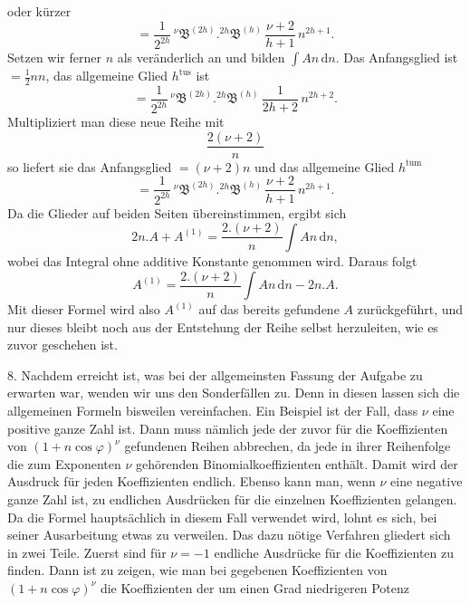 \par\noindent{}%
oder kürzer
\[
= \frac{1}{2^{2h}}\,{}^{\nu}\mathfrak{B}^{(2h)} .  {}^{2h}\mathfrak{B}^{(h)}\,\frac{\nu+2}{h+1}\,n^{2h+1}.
\]
Setzen wir ferner $n$ als veränderlich an und bilden $\int An\,\mathrm{d}n$. Das Anfangsglied ist $=\frac{1}{2}nn$, das allgemeine Glied $h^{\text{tus}}$ ist
\[
= \frac{1}{2^{2h}}\,{}^{\nu}\mathfrak{B}^{(2h)} .  {}^{2h}\mathfrak{B}^{(h)}\,\frac{1}{2h+2}\,n^{2h+2}.
\]
Multipliziert man diese neue Reihe mit
\[
\frac{2(\nu+2)}{n}
\]
so liefert sie das Anfangsglied $=(\nu+2)n$ und das allgemeine Glied $h^{\text{tum}}$
\[
= \frac{1}{2^{2h}}\,{}^{\nu}\mathfrak{B}^{(2h)} .  {}^{2h}\mathfrak{B}^{(h)}\,\frac{\nu+2}{h+1}\,n^{2h+1}.
\]
Da die Glieder auf beiden Seiten übereinstimmen, ergibt sich
\[
2n .  A + A^{(1)} = \frac{2 . (\nu+2)}{n}\int An\,\mathrm{d}n,
\]
wobei das Integral ohne additive Konstante genommen wird. Daraus folgt
\[
A^{(1)} = \frac{2 . (\nu+2)}{n}\int An\,\mathrm{d}n - 2n .  A.
\]
\noindent\hspace*{\parindent}Mit dieser Formel wird also $A^{(1)}$ auf das bereits gefundene $A$ zurückgeführt, und nur dieses bleibt noch aus der Entstehung der Reihe selbst herzuleiten, wie es zuvor geschehen ist.

8. Nachdem erreicht ist, was bei der allgemeinsten Fassung der Aufgabe zu erwarten war, wenden wir uns den Sonderfällen zu. Denn in diesen lassen sich die allgemeinen Formeln bisweilen vereinfachen. Ein Beispiel ist der Fall, dass $\nu$ eine positive ganze Zahl ist. Dann muss nämlich jede der zuvor für die Koeffizienten von $(1+n\cos\varphi)^{\nu}$ gefundenen Reihen abbrechen, da jede in ihrer Reihenfolge die zum Exponenten $\nu$ gehörenden Binomialkoeffizienten enthält. Damit wird der Ausdruck für jeden Koeffizienten endlich. Ebenso kann man, wenn $\nu$ eine negative ganze Zahl ist, zu endlichen Ausdrücken für die einzelnen Koeffizienten gelangen. Da die Formel hauptsächlich in diesem Fall verwendet wird, lohnt es sich, bei seiner Ausarbeitung etwas zu verweilen. Das dazu nötige Verfahren gliedert sich in zwei Teile. Zuerst sind für $\nu=-1$ endliche Ausdrücke für die Koeffizienten zu finden. Dann ist zu zeigen, wie man bei gegebenen Koeffizienten von $(1+n\cos\varphi)^{\nu}$ die Koeffizienten der um einen Grad niedrigeren Potenz
